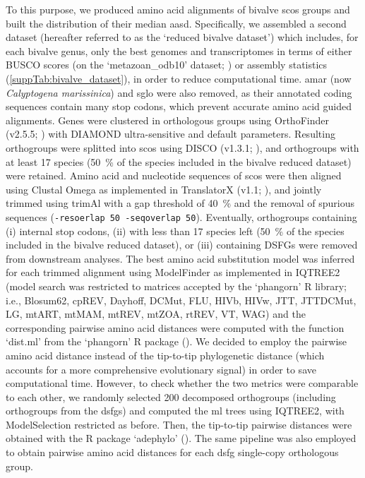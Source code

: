 To this purpose, we produced amino acid alignments of bivalve \glspl{sco} groups and built the distribution of their median \gls{aasd}. Specifically, we assembled a second dataset (hereafter referred to as the ‘reduced bivalve dataset’) which includes, for each bivalve genus, only the best genomes and transcriptomes in terms of either BUSCO scores (on the ‘metazoan\_odb10’ dataset; ) or assembly statistics (\cref{suppTab:bivalve_dataset}), in order to reduce computational time. \gls{amar} (now \textit{Calyptogena marissinica}) and \gls{sglo} were also removed, as their annotated coding sequences contain many stop codons, which prevent accurate amino acid guided alignments. Genes were clustered in orthologous groups using OrthoFinder (v2.5.5; ) with DIAMOND ultra-sensitive and default parameters. Resulting orthogroups were splitted into \glspl{sco} using DISCO (v1.3.1; ), and orthogroups with at least 17 species (\qty{50}{\percent} of the species included in the bivalve reduced dataset) were retained. Amino acid and nucleotide sequences of \glspl{sco} were then aligned using Clustal Omega as implemented in TranslatorX (v1.1; ), and jointly trimmed using trimAl with a gap threshold of \qty{40}{\percent} and the removal of spurious sequences (\verb|-resoerlap 50 -seqoverlap 50|). Eventually, orthogroups containing (i) internal stop codons, (ii) with less than 17 species left (\qty{50}{\percent} of the species included in the bivalve reduced dataset), or (iii) containing DSFGs were removed from downstream analyses. The best amino acid substitution model was inferred for each trimmed alignment using ModelFinder as implemented in IQTREE2 (model search was restricted to matrices accepted by the ‘phangorn’ R library; i.e., Blosum62, cpREV, Dayhoff, DCMut, FLU, HIVb, HIVw, JTT, JTTDCMut, LG, mtART, mtMAM, mtREV, mtZOA, rtREV, VT, WAG) and the corresponding pairwise amino acid distances were computed with the function ‘dist.ml’ from the ‘phangorn’ R package (). We decided to employ the pairwise amino acid distance instead of the tip-to-tip phylogenetic distance (which accounts for a more comprehensive evolutionary signal) in order to save computational time. However, to check whether the two metrics were comparable to each other, we randomly selected 200 decomposed orthogroups (including orthogroups from the \glspl{dsfg}) and computed the \gls{ml} trees using IQTREE2, with ModelSelection restricted as before. Then, the tip-to-tip pairwise distances were obtained with the R package ‘adephylo’ (). The same pipeline was also employed to obtain pairwise amino acid distances for each \gls{dsfg} single-copy orthologous group.

